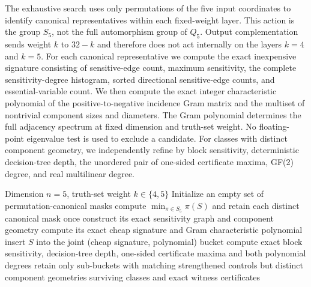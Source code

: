 
The exhaustive search uses only permutations of the five input coordinates
to identify canonical representatives within each fixed-weight layer.
This action is the group $S_5$, not the full automorphism group of $Q_5$.
Output complementation sends weight $k$ to $32-k$ and therefore does
not act internally on the layers $k=4$ and $k=5$.
For each canonical representative we compute the exact inexpensive
signature consisting of sensitive-edge count, maximum sensitivity,
the complete sensitivity-degree histogram, sorted directional
sensitive-edge counts, and essential-variable count.
We then compute the exact integer characteristic polynomial of the
positive-to-negative incidence Gram matrix and the multiset of
nontrivial component sizes and diameters. The Gram polynomial
determines the full adjacency spectrum at fixed dimension and
truth-set weight. No floating-point eigenvalue test is used to
exclude a candidate. For classes with distinct component geometry,
we independently refine by block sensitivity, deterministic
decision-tree depth, the unordered pair of one-sided certificate
maxima, GF(2) degree, and real multilinear degree.

\begin{algorithm}[H]
\caption{Exact exhaustive search for sensitivity-graph geometry separation}
\label{alg:search}
\begin{algorithmic}[1]
\Require Dimension $n=5$, truth-set weight $k\in\{4,5\}$
\State Initialize an empty set of permutation-canonical masks
  \State compute $\min_{\pi\in S_5}\pi(S)$ and retain each distinct canonical mask once
\EndFor
{}
  \State construct its exact sensitivity graph and component geometry
  \State compute its exact cheap signature and Gram characteristic polynomial
  \State insert $S$ into the joint (cheap signature, polynomial) bucket
\EndFor
{}
  \State compute exact block sensitivity, decision-tree depth,
  \Statex \hspace{\algorithmicindent} one-sided certificate maxima and both polynomial degrees
  \State retain only sub-buckets with matching strengthened controls
  \Statex \hspace{\algorithmicindent} but distinct component geometries
\EndFor
\State \Return surviving classes and exact witness certificates
\end{algorithmic}
\end{algorithm}

